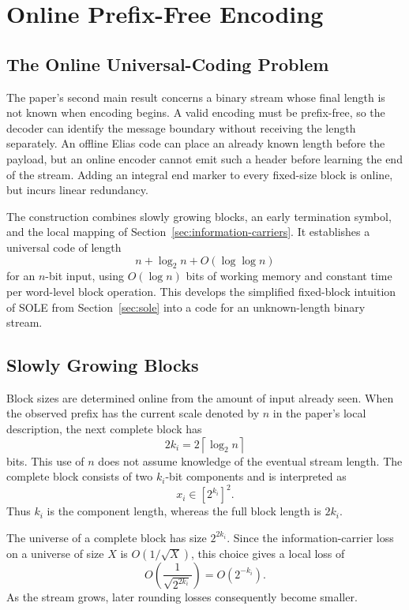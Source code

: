 \section{Online Prefix-Free Encoding}
\label{sec:online-prefix-free-encoding}

\subsection{The Online Universal-Coding Problem}

The paper's second main result concerns a binary stream whose final length
is not known when encoding begins. A valid encoding must be prefix-free, so
the decoder can identify the message boundary without receiving the length
separately. An offline Elias code can place an already known length before
the payload, but an online encoder cannot emit such a header before learning
the end of the stream. Adding an integral end marker to every fixed-size
block is online, but incurs linear redundancy.

The construction combines slowly growing blocks, an early termination
symbol, and the local mapping of Section~\ref{sec:information-carriers}. It
establishes a universal code of length
\[
    n+\log_2 n+O(\log\log n)
\]
for an \(n\)-bit input, using \(O(\log n)\) bits of working memory and
constant time per word-level block operation. This develops the simplified
fixed-block intuition of SOLE from Section~\ref{sec:sole} into a code for an
unknown-length binary stream.

\subsection{Slowly Growing Blocks}

Block sizes are determined online from the amount of input already seen.
When the observed prefix has the current scale denoted by \(n\) in the
paper's local description, the next complete block has
\[
    2k_i=2\left\lceil\log_2 n\right\rceil
\]
bits. This use of \(n\) does not assume knowledge of the eventual stream
length. The complete block consists of two \(k_i\)-bit components and is
interpreted as
\[
    x_i\in[2^{k_i}]^2.
\]
Thus \(k_i\) is the component length, whereas the full block length is
\(2k_i\).

The universe of a complete block has size \(2^{2k_i}\). Since the
information-carrier loss on a universe of size \(X\) is
\(O(1/\sqrt X)\), this choice gives a local loss of
\[
    O\left(\frac{1}{\sqrt{2^{2k_i}}}\right)
    =O(2^{-k_i}).
\]
As the stream grows, later rounding losses consequently become smaller.

